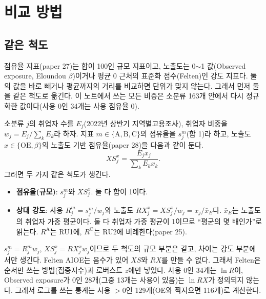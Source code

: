 \documentclass[11pt]{article}
\begin{document}
\begin{abstract}
\begin{itemize}[leftmargin=*]
  \item \textbf{거리로 보면 순위와 다른 직업이 드러난다.} 지표 C와 Eloundou $\beta$의 로그 거리 $d$는 사용 $> 0$인 129개 중 108개에서 두 배를 넘고, 51개에서 열 배를 넘는다. $d$와 순위 격차의 순위상관은 0.26뿐이다. $d$는 취업자 수와 음의 상관($-0.57$)을 보인다. 큰 직업일수록 사용이 노출도에 못 미친다는 뜻이다. 다만 $d$의 아래쪽 끝은 사용 점유율이 거의 0인 직업(조리사, 작물 재배, 자동차 운전원 등)이 차지한다. 이 값들은 추정이 가장 불안정한 곳이므로 로버스트 $z$ 차이 $\Delta z$와 함께 읽어야 한다. 사용이 0인 34개는 $d$와 $\Delta z$가 정의되지 않는다.
\end{itemize}
\end{abstract}

\section{비교 방법}

\subsection{같은 척도}

점유율 지표(paper 27)는 합이 100인 규모 지표이고, 노출도는 0$\sim$1 값(Observed exposure, Eloundou $\beta$)이거나 평균 0 근처의 표준화 점수(Felten)인 강도 지표다. 둘의 값을 바로 빼거나 평균까지의 거리를 비교하면 단위가 맞지 않는다. 그래서 먼저 둘을 같은 척도로 옮긴다. 이 노트에서 쓰는 모든 비중은 소분류 163개 안에서 다시 정규화한 값이다(사용 0인 34개는 사용 점유율 0).

소분류 $j$의 취업자 수를 $E_j$(2022년 상반기 지역별고용조사), 취업자 비중을 $w_j = E_j / \sum_k E_k$라 하자. 지표 $m \in \{\text{A}, \text{B}, \text{C}\}$의 점유율을 $s^m_j$(합 1)라 하고, 노출도 $x \in \{\text{OE}, \beta\}$의 노출도 기반 점유율(paper 28)을 다음과 같이 둔다.
\[
XS^x_j = \frac{E_j x_j}{\sum_k E_k x_k}.
\]
그러면 두 가지 같은 척도가 생긴다.
\begin{itemize}[leftmargin=*]
  \item \textbf{점유율(규모)}: $s^m_j$와 $XS^x_j$. 둘 다 합이 1이다.
  \item \textbf{상대 강도}: 사용 $R^m_j = s^m_j / w_j$와 노출도 $RX^x_j = XS^x_j / w_j = x_j / \bar{x}_E$다. $\bar{x}_E$는 노출도의 취업자 가중 평균이다. 둘 다 취업자 가중 평균이 1이므로 ``평균의 몇 배인가''로 읽는다. $R^{\mathrm{A}}$는 RU1에, $R^{\mathrm{C}}$는 RU2에 비례한다(paper 25).
\end{itemize}
$s^m_j = R^m_j w_j$, $XS^x_j = RX^x_j w_j$이므로 두 척도의 규모 부분은 같고, 차이는 강도 부분에서만 생긴다. Felten AIOE는 음수가 있어 $XS$와 $RX$를 만들 수 없다. 그래서 Felten은 순서만 쓰는 방법(집중지수)과 로버스트 $z$에만 넣었다. 사용 0인 34개는 $\ln R$이, Observed exposure가 0인 28개(그중 13개는 사용이 있음)는 $\ln RX$가 정의되지 않는다. 그래서 로그를 쓰는 통계는 사용 $> 0$인 129개(OE와 짝지으면 116개)로 계산한다.
\end{document}
